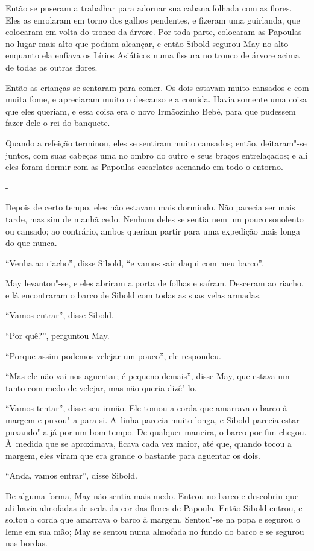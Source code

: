 Então se puseram a trabalhar para adornar sua cabana folhada com as
flores. Eles as enrolaram em torno dos galhos pendentes, e fizeram uma
guirlanda, que colocaram em volta do tronco da árvore. Por toda parte,
colocaram as Papoulas no lugar mais alto que podiam alcançar, e então
Sibold segurou May no alto enquanto ela enfiava os Lírios Asiáticos numa
fissura no tronco de árvore acima de todas as outras flores.

Então as crianças se sentaram para comer. Os dois estavam muito cansados
e com muita fome, e apreciaram muito o descanso e a comida. Havia
somente uma coisa que eles queriam, e essa coisa era o novo Irmãozinho
Bebê, para que pudessem fazer dele o rei do banquete.

Quando a refeição terminou, eles se sentiram muito cansados; então,
deitaram"-se juntos, com suas cabeças uma no ombro do outro e seus braços
entrelaçados; e ali eles foram dormir com as Papoulas escarlates
acenando em todo o entorno.

-

Depois de certo tempo, eles não estavam mais dormindo. Não parecia ser
mais tarde, mas sim de manhã cedo. Nenhum deles se sentia nem um pouco
sonolento ou cansado; ao contrário, ambos queriam partir para uma
expedição mais longa do que nunca.

``Venha ao riacho'', disse Sibold, ``e vamos sair daqui com meu barco''.

May levantou"-se, e eles abriram a porta de folhas e saíram. Desceram ao
riacho, e lá encontraram o barco de Sibold com todas as suas velas
armadas.

``Vamos entrar'', disse Sibold.

``Por quê?'', perguntou May.

``Porque assim podemos velejar um pouco'', ele respondeu.

``Mas ele não vai nos aguentar; é pequeno demais'', disse May, que
estava um tanto com medo de velejar, mas não queria dizê"-lo.

``Vamos tentar'', disse seu irmão. Ele tomou a corda que amarrava o
barco à margem e puxou"-a para si. A~linha parecia muito longa, e Sibold
parecia estar puxando"-a já por um bom tempo. De qualquer maneira, o
barco por fim chegou. À~medida que se aproximava, ficava cada vez maior,
até que, quando tocou a margem, eles viram que era grande o bastante
para aguentar os dois.

``Anda, vamos entrar'', disse Sibold.

De alguma forma, May não sentia mais medo. Entrou no barco e descobriu
que ali havia almofadas de seda da cor das flores de Papoula. Então
Sibold entrou, e soltou a corda que amarrava o barco à margem. Sentou"-se
na popa e segurou o leme em sua mão; May se sentou numa almofada no
fundo do barco e se segurou nas bordas.

